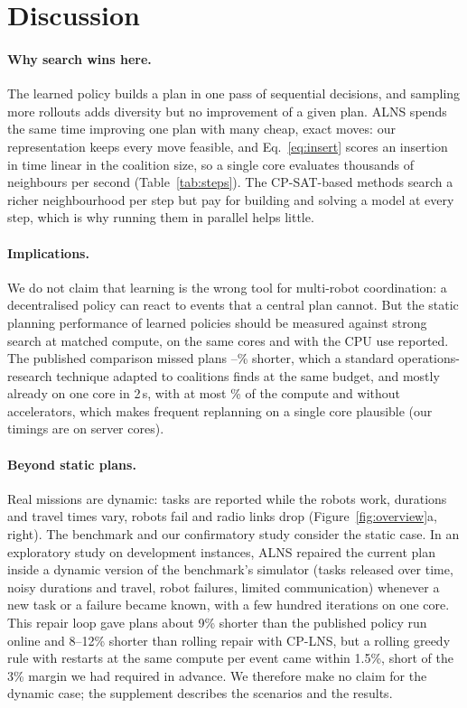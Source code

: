 \section{Discussion}
\label{sec:discussion}

\paragraph{Why search wins here.} The learned policy builds a plan in one pass of sequential decisions, and sampling
more rollouts adds diversity but no improvement of a given plan. ALNS spends the same time improving one plan with
many cheap, exact moves: our representation keeps every move feasible, and Eq.~\eqref{eq:insert} scores an insertion
in time linear in the coalition size, so a single core evaluates thousands of neighbours per second
(Table~\ref{tab:steps}). The CP-SAT-based methods search a richer neighbourhood per step but pay for building and
solving a model at every step, which is why running them in parallel helps little.

\paragraph{Implications.} We do not claim that learning is the wrong tool for multi-robot coordination: a
decentralised policy can react to events that a central plan cannot. But the static planning performance of
learned policies should be measured against strong search at matched compute, on the same cores and with the CPU
use reported. The published comparison missed plans \ConeBrlgainlo--\ConeBrlgainhi\% shorter, which a standard
operations-research technique adapted to coalitions finds at the same budget, and mostly already on one core in 2\,s,
with at most \ShareTwohi\% of the compute and without accelerators, which makes frequent replanning on a single
core plausible (our timings are on server cores).

\paragraph{Beyond static plans.} Real missions are dynamic: tasks are reported while the robots work, durations and
travel times vary, robots fail and radio links drop (Figure~\ref{fig:overview}a, right). The benchmark and our
confirmatory study consider the static case. In an exploratory study on development instances, ALNS repaired
the current plan inside a dynamic version of the benchmark's simulator (tasks released over time, noisy durations and
travel, robot failures, limited communication) whenever a new task or a failure became known, with a few hundred
iterations on one core.
This repair loop gave plans about 9\% shorter than the published policy run online and 8--12\% shorter than rolling
repair with CP-LNS, but a rolling greedy rule with restarts at the same compute per event came within 1.5\%, short of
the 3\% margin we had required in advance. We therefore make no claim for the dynamic case; the supplement describes
the scenarios and the results.

